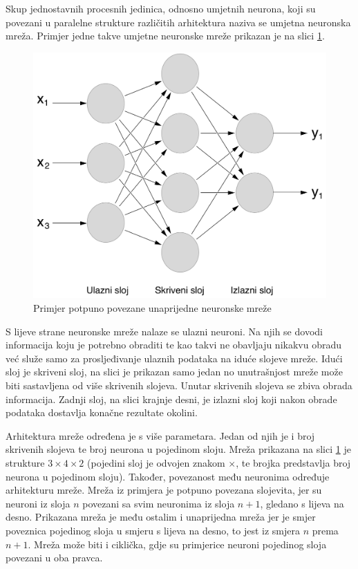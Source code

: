 Skup jednostavnih procesnih jedinica, odnosno umjetnih neurona, koji su povezani u paralelne strukture različitih arhitektura naziva se umjetna neuronska mreža. Primjer jedne takve umjetne neuronske mreže prikazan je na slici \ref{fig:neural_net}.
\begin{figure}[htb]
    \centering
    \includegraphics[width=12cm]{images/neural_net.pdf}
    \caption{Primjer potpuno povezane unaprijedne neuronske mreže}
    \label{fig:neural_net}
\end{figure}

S lijeve strane neuronske mreže nalaze se ulazni neuroni. Na njih se dovodi informacija koju je potrebno obraditi te kao takvi ne obavljaju nikakvu obradu već služe samo za prosljeđivanje ulaznih podataka na iduće slojeve mreže. Idući sloj je skriveni sloj, na slici je prikazan samo jedan no unutrašnjost mreže može biti sastavljena od više skrivenih slojeva. Unutar skrivenih slojeva se zbiva obrada informacija. Zadnji sloj, na slici krajnje desni, je izlazni sloj koji nakon obrade podataka dostavlja konačne rezultate okolini.

Arhitektura mreže određena je s više parametara. Jedan od njih je i broj skrivenih slojeva te broj neurona u pojedinom sloju. Mreža prikazana na slici \ref{fig:neural_net} je strukture \mbox{$3 \times 4 \times 2$} (pojedini sloj je odvojen znakom $\times$, te brojka predstavlja broj neurona u pojedinom sloju). Također, povezanost među neuronima određuje arhitekturu mreže. Mreža iz primjera je potpuno povezana slojevita, jer su neuroni iz sloja $n$ povezani sa svim neuronima iz sloja $n+1$, gledano s lijeva na desno. Prikazana mreža je među ostalim i unaprijedna mreža jer je smjer poveznica pojedinog sloja u smjeru s lijeva na desno, to jest iz smjera $n$ prema $n+1$. Mreža može biti i ciklička, gdje su primjerice neuroni pojedinog sloja povezani u oba pravca.

